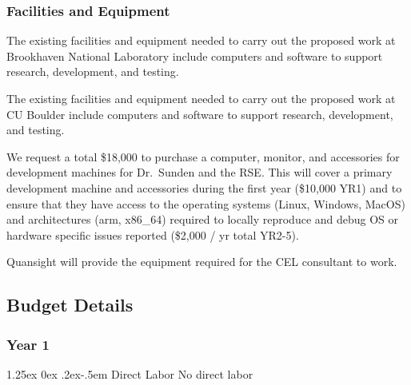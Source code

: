 \documentclass[12pt]{article}
\makeatletter
\numberwithin{page}{section}
\renewcommand{\paragraph}{%
  \@startsection{paragraph}{4}%
  {\z@}{1.25ex \@plus 0ex \@minus .2ex}{-.5em}%
  {\normalfont\normalsize\itshape\bfseries}%
}
\makeatother
\begin{document}
\subsubsection{Facilities and Equipment}

The existing facilities and equipment needed to carry out the proposed work at
Brookhaven National Laboratory include computers and software to support
research, development, and testing.

The existing facilities and equipment needed to carry out the proposed work at
CU Boulder include computers and software to support
research, development, and testing.

We request a total \$18,000 to purchase a computer, monitor, and accessories
for development machines for Dr.\ Sunden and the RSE.  This will cover a
primary development machine and accessories during the first year (\$10,000
YR1) and to ensure that they have access to the operating systems (Linux,
Windows, MacOS) and architectures (arm, x86\_64) required to locally reproduce
and debug OS or hardware specific issues reported (\$2,000 / yr total YR2-5).

Quansight will provide the equipment required for the CEL consultant to work.

\subsection{Budget Details}
\subsubsection{Year 1}
\paragraph{Direct Labor}
No direct labor
\end{document}

